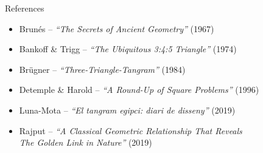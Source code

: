\documentclass[14pt]{beamer}
\begin{document}
    \begin{frame}{References}
        \begin{center}
            {\footnotesize
            \begin{itemize}
                \item Brunés -- \emph{``The Secrets of Ancient Geometry''} (1967)
                \item Bankoff \& Trigg -- \emph{``The Ubiquitous 3:4:5 Triangle''} (1974)
                \item Brügner -- \emph{``Three-Triangle-Tangram''} (1984)
                \item Detemple \& Harold -- \emph{``A Round-Up of Square Problems''} (1996)
                \item Luna-Mota -- \emph{``El tangram egipci: diari de disseny''}  (2019)
                \item Rajput -- \emph{``A Classical Geometric Relationship That Reveals\\\qquad\qquad The Golden Link in Nature''} (2019)
            \end{itemize}}
        \end{center}
    \end{frame}

\end{document}
